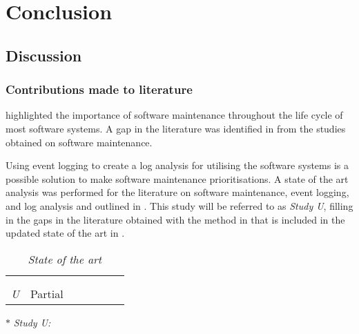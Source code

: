 \chapter{Conclusion}
\label{chap:4}

\section{Discussion}

\subsection{Contributions made to literature}
 highlighted the importance of software maintenance throughout the life cycle of most software systems. A gap in the literature was identified in  from the studies obtained on software maintenance. \par Using event logging to create a log analysis for utilising the software systems is a possible solution to make software maintenance prioritisations. A state of the art analysis was performed for the literature on software maintenance, event logging, and log analysis and outlined in . This study will be referred to as \textit{Study U}, filling in the gaps in the literature obtained with the method in  that is included in the updated state of the art in .

\begin{table}[!htb]
	\centering
	\caption[State of the art]
	{\textit{State of the art}}
	\label{tbl:ch4_stateOfTheArt}
	\begin{threeparttable}
		\begin{tabularx}{\textwidth}{cYYYYYY}
			\toprule
			 &  &  &  \\ 
			 \cmidrule(lr){2-4} \cmidrule(lr){5-6} \cmidrule(lr){7-7}
			 & \RaggedRight {} & \RaggedRight {} & \RaggedRight {} &  &  & \RaggedRight {} \\ 		
			\midrule
				\sotaCore
				\textit{U}\tnote{$\ast$} & Partial & \cmark & \cmark & \cmark & \cmark & \cmark \\
			\bottomrule
		\end{tabularx}
		\begin{tablenotes}\footnotesize
			\item[$\ast$] \textit{Study U:~\ThesisTitle}
		\end{tablenotes}
	\end{threeparttable}
\end{table}

